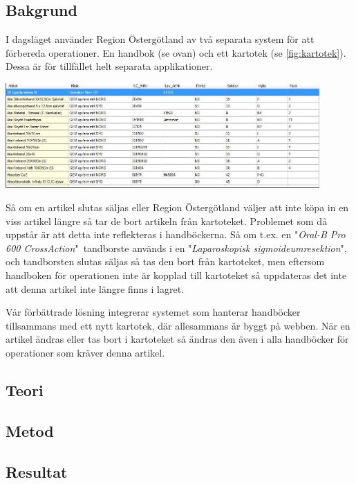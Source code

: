 \subsection{Bakgrund}
I dagsläget använder Region Östergötland av två separata system
för att förbereda operationer. En handbok (se ovan) och ett kartotek (se \ref{fig:kartotek}).
Dessa är för tillfället helt separata applikationer.

\begin{center}
  \includegraphics[width=0.9\textwidth]{../images/forradsinfo.jpg}
  \label{fig:kartotek}
\end{center}

Så om en artikel slutas säljas eller Region Östergötland
väljer att inte köpa in en viss artikel längre så tar de bort artikeln
från kartoteket. Problemet som då uppstår är att detta inte reflekteras
i handböckerna. Så om t.ex. en "\textit{Oral-B Pro 600 CrossAction}"\ tandborste används i
en "\textit{Laparoskopisk sigmoideumresektion}", och tandborsten slutas säljas
så tas den bort från kartoteket, men eftersom handboken för operationen inte är
kopplad till kartoteket så uppdateras det inte att denna artikel inte längre finns i lagret.

Vår förbättrade lösning
integrerar systemet som hanterar handböcker tillsammans med ett nytt kartotek,
där allesammans är byggt på webben. När en artikel ändras eller tas bort i kartoteket
så ändras den även i alla handböcker för operationer som kräver denna artikel.



\subsection{Teori}


\subsection{Metod}
\subsection{Resultat}
